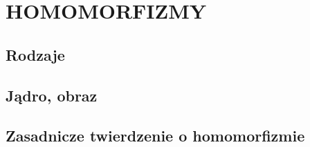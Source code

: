 \section{HOMOMORFIZMY}

\subsection{Rodzaje}

\subsection{Jądro, obraz}

\subsection{Zasadnicze twierdzenie o homomorfizmie}
